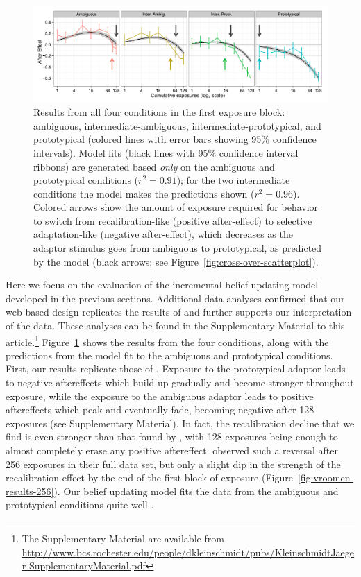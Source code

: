 \begin{figure}[!h]
  \centering
  \includegraphics[width=\textwidth]{intr-model-ae-firstblock-xover-arrows.pdf}
  \caption{Results from all four conditions in the first exposure block: ambiguous, intermediate-ambiguous, intermediate-prototypical, and prototypical (colored lines with error bars showing 95\% confidence intervals). Model fits (black lines with 95\% confidence interval ribbons) are generated based \emph{only} on the ambiguous and prototypical conditions ($r^2=0.91$); for the two intermediate conditions the model makes the predictions shown ($r^2=0.96$).  Colored arrows show the amount of exposure required for behavior to switch from recalibration-like (positive after-effect) to selective adaptation-like (negative after-effect), which decreases as the adaptor stimulus goes from ambiguous to prototypical, as predicted by the model (black arrows; see Figure~\ref{fig:cross-over-scatterplot}).}
  \label{fig:intr-results-fits}
\end{figure}

Here we focus on the evaluation of the incremental belief updating model developed in the previous sections. Additional data analyses confirmed that our web-based design replicates the results of  and further supports our interpretation of the data. These analyses can be found in the Supplementary Material to this article.\footnote{The Supplementary Material are available from \url{http://www.bcs.rochester.edu/people/dkleinschmidt/pubs/KleinschmidtJaeger-SupplementaryMaterial.pdf}}
Figure~\ref{fig:intr-results-fits} shows the results from the four conditions, along with the predictions from the model fit to the ambiguous and prototypical conditions.  First, our results replicate those of .  Exposure to the prototypical adaptor leads to negative aftereffects which build up gradually and become stronger throughout exposure, while the exposure to the ambiguous adaptor leads to positive aftereffects which peak and eventually fade, becoming negative after 128 exposures (see Supplementary Material).
In fact, the recalibration decline that we find is even stronger than that found by , with 128 exposures being enough to almost completely erase any positive aftereffect.   observed such a reversal after 256 exposures in their full data set, but only a slight dip in the strength of the recalibration effect by the end of the first block of exposure (Figure~\ref{fig:vroomen-results-256}).
Our belief updating model fits the data from the ambiguous and prototypical conditions quite well \autocite[$r^2=0.91$ overall, vs. $r^2=0.93$ when fit to][]{Vroomen2007}.

